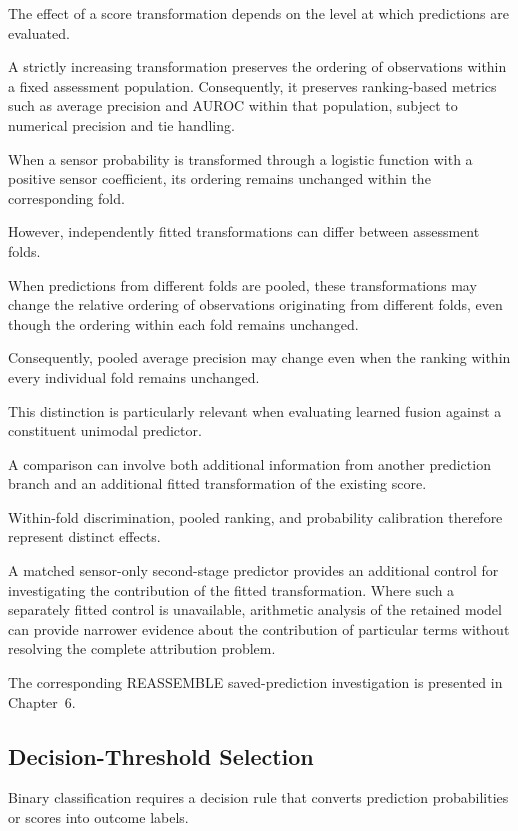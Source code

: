 The effect of a score transformation depends on the level at which predictions are evaluated.

A strictly increasing transformation preserves the ordering of observations within a fixed assessment population. Consequently, it preserves ranking-based metrics such as average precision and AUROC within that population, subject to numerical precision and tie handling.

When a sensor probability is transformed through a logistic function with a positive sensor coefficient, its ordering remains unchanged within the corresponding fold.

However, independently fitted transformations can differ between assessment folds.

When predictions from different folds are pooled, these transformations may change the relative ordering of observations originating from different folds, even though the ordering within each fold remains unchanged.

Consequently, pooled average precision may change even when the ranking within every individual fold remains unchanged.

This distinction is particularly relevant when evaluating learned fusion against a constituent unimodal predictor.

A comparison can involve both additional information from another prediction branch and an additional fitted transformation of the existing score.

Within-fold discrimination, pooled ranking, and probability calibration therefore represent distinct effects.

A matched sensor-only second-stage predictor provides an additional control for investigating the contribution of the fitted transformation. Where such a separately fitted control is unavailable, arithmetic analysis of the retained model can provide narrower evidence about the contribution of particular terms without resolving the complete attribution problem.

The corresponding REASSEMBLE saved-prediction investigation is presented in Chapter~6.

\subsection{Decision-Threshold Selection}

Binary classification requires a decision rule that converts prediction probabilities or scores into outcome labels.

